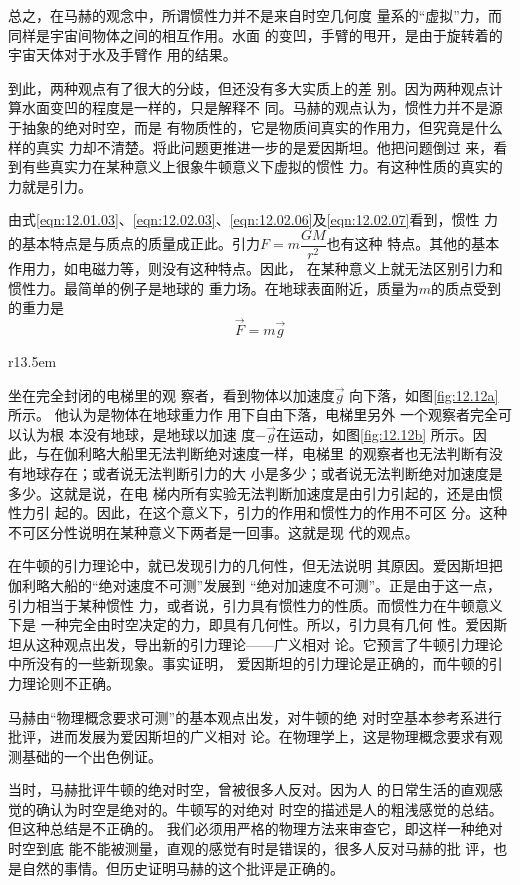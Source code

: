 \documentclass[../outline-of-mechanics.tex]{subfiles}
\begin{document}
总之，在马赫的观念中，所谓惯性力并不是来自时空几何度
量系的“虚拟”力，而同样是宇宙间物体之间的相互作用。水面
的变凹，手臂的甩开，是由于旋转着的宇宙天体对于水及手臂作
用的结果。

到此，两种观点有了很大的分歧，但还没有多大实质上的差
别。因为两种观点计算水面变凹的程度是一样的，只是解释不
同。马赫的观点认为，惯性力并不是源于抽象的绝对时空，而是
有物质性的，它是物质间真实的作用力，但究竟是什么样的真实
力却不清楚。将此问题更推进一步的是爱因斯坦。他把问题倒过
来，看到有些真实力在某种意义上很象牛顿意义下虚拟的惯性
力。有这种性质的真实的力就是引力。

由式\eqref{eqn:12.01.03}、\eqref{eqn:12.02.03}、\eqref{eqn:12.02.06}及\eqref{eqn:12.02.07}看到，惯性
力的基本特点是与质点的质量成正此。引力$ F = m \dfrac { G M } { r ^ { 2 } } $也有这种
特点。其他的基本作用力，如电磁力等，则没有这种特点。因此，
在某种意义上就无法区别引力和惯性力。最简单的例子是地球的
重力场。在地球表面附近，质量为$ m $的质点受到的重力是
\begin{equation*}
  \vec{F} = m \vec{g}
\end{equation*}
\begin{wrapfigure}[8]{r}{13.5em}
  \vspace{-2em}
  \centering
  \caption{}
  \label{fig:12.12}
\end{wrapfigure}
坐在完全封闭的电梯里的观
察者，看到物体以加速度$ \vec{g} $
向下落，如图\ref{fig:12.12a}所示。
他认为是物体在地球重力作
用下自由下落，电梯里另外
一个观察者完全可以认为根
本没有地球，是地球以加速
度$-\vec{g}$在运动，如图\ref{fig:12.12b}
所示。因此，与在伽利略大船里无法判断绝对速度一样，电梯里
的观察者也无法判断有没有地球存在；或者说无法判断引力的大
小是多少；或者说无法判断绝对加速度是多少。这就是说，在电
梯内所有实验无法判断加速度是由引力引起的，还是由惯性力引
起的。因此，在这个意义下，引力的作用和惯性力的作用不可区
分。这种不可区分性说明在某种意义下两者是一回事。这就是现
代的观点。

在牛顿的引力理论中，就已发现引力的几何性，但无法说明
其原因。爱因斯坦把伽利略大船的“绝对速度不可测”发展到
“绝对加速度不可测”。正是由于这一点，引力相当于某种惯性
力，或者说，引力具有惯性力的性质。而惯性力在牛顿意义下是
一种完全由时空决定的力，即具有几何性。所以，引力具有几何
性。爱因斯坦从这种观点出发，导出新的引力理论——广义相对
论。它预言了牛顿引力理论中所没有的一些新现象。事实证明，
爱因斯坦的引力理论是正确的，而牛顿的引力理论则不正确。

{马\ziju{-0.005pt}赫由“物理概念要求可测”的基本观点出发，对牛顿的绝
对时空基本参考系进行批评，进而发展为爱因斯坦的广义相对
论。在物理学上，这是物理概念要求有观测基础的一个出色例证。}

当时，马赫批评牛顿的绝对时空，曾被很多人反对。因为人
的日常生活的直观感觉的确认为时空是绝对的。牛顿写的对绝对
时空的描述是人的粗浅感觉的总结。但这种总结是不正确的。
我们必须用严格的物理方法来审查它，即这样一种绝对时空到底
能不能被测量，直观的感觉有时是错误的，很多人反对马赫的批
评，也是自然的事情。但历史证明马赫的这个批评是正确的。
\end{document}
